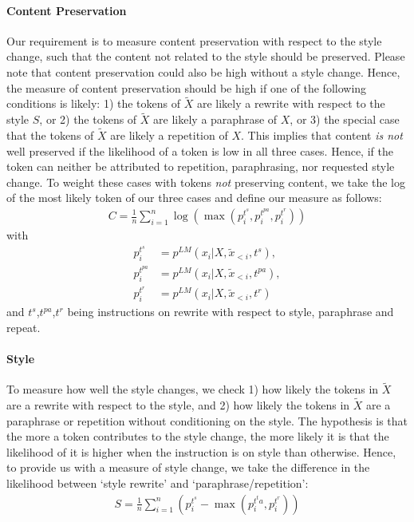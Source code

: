 \paragraph{Content Preservation}
Our requirement is to measure content preservation with respect to the style change, such that the content not related to the style should be preserved. Please note that content preservation could also be high without a style change. Hence, the measure of content preservation should be high if one of the following conditions is likely: 1)  the tokens of \(\tilde{X}\) are likely a rewrite with respect to the style $S$, or 2)  the tokens of \(\tilde{X}\) are likely a paraphrase of $X$, or 3) the special case that the tokens of \(\tilde{X}\) are likely a repetition of $X$. This implies that content \textit{is not} well preserved if the likelihood of a token is low in all three cases. Hence, if the token can neither be attributed to repetition, paraphrasing, nor requested style change. To weight these cases with tokens \textit{not} preserving content, we take the log of the most likely token of our three cases and define our measure as follows: 
\begin{align}
    C = \frac{1}{n} \sum_{i=1}^{n} \log \left( \max \left( p_{i}^{t^s}, p_{i}^{t^{pa}},p_{i}^{t^r}  \right) \right)
\end{align}
with 
\vspace{-1em}
\begin{align*}
    p_{i}^{t^s}& = p^{LM}(x_i | X, \tilde{x}_{<i}, t^s), \\
    p_{i}^{t^{pa}}& = p^{LM}(x_i | X, \tilde{x}_{<i}, t^{pa}), \\ p_{i}^{t^{r}}& =p^{LM}(x_i | X, \tilde{x}_{<i}, t^r)
\end{align*}
and $t^s$,$t^{pa}$,$t^r$ being instructions on rewrite with respect to style, paraphrase and repeat.
\paragraph{Style} To measure how well the style changes, we check 1) how likely the tokens in \(\tilde{X}\) are a rewrite with respect to the style, and 2) how likely the tokens in \(\tilde{X}\) are a paraphrase or repetition without conditioning on the style. The hypothesis is that the more a token contributes to the style change, the more likely it is that the likelihood of it is higher when the instruction is on style than otherwise. Hence, to provide us with a measure of style change, we take the difference in the likelihood between `style rewrite' and `paraphrase/repetition': 
\begin{align}
    S=\frac{1}{n}\sum_{i=1}^{n} \left(p_{i}^{t^s} - \max \left(p_{i}^{t^ta},p_{i}^{t^r}  \right)\right)
\end{align}
